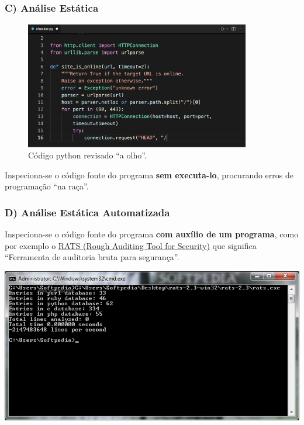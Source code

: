 \documentclass[
]{book}
\begin{document}
\subsubsection{C) Análise Estática}\label{c-anuxe1lise-estuxe1tica}

\begin{figure}
\centering
\includegraphics[width=3.875in,height=\textheight]{images/analise-estatica-python.jpg}
\caption{Código python revisado ``a olho''.}
\end{figure}

Inspeciona-se o código fonte do programa \textbf{sem executa-lo}, procurando erros de programação ``na raça''.

\subsubsection{D) Análise Estática Automatizada}\label{d-anuxe1lise-estuxe1tica-automatizada}

Inspeciona-se o código fonte do programa \textbf{com auxílio de um programa}, como por exemplo o \href{https://www.security-database.com/toolswatch/RATS-v2-3-Rough-Auditing-Tool-for.html}{RATS (Rough Auditing Tool for Security)} que significa ``Ferramenta de auditoria bruta para segurança''.

\includegraphics{images/VerificacaoValidacao/TecnicasEstaticas/rats-2.3.jpg}
\end{document}
